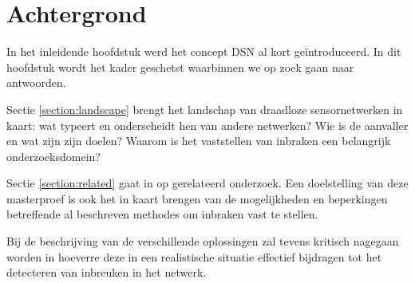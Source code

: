
\chapter{Achtergrond}
\label{chapter:achtergrond}

In het inleidende hoofdstuk werd het concept DSN al kort ge\"introduceerd. In
dit hoofdstuk wordt het kader geschetst waarbinnen we op zoek gaan naar
antwoorden.

Sectie \ref{section:landscape} brengt het landschap van draadloze
sensornetwerken in kaart: wat typeert en onderscheidt hen van andere netwerken?
Wie is de aanvaller en wat zijn zijn doelen? Waarom is het vaststellen van
inbraken een belangrijk onderzoeksdomein?

Sectie \ref{section:related} gaat in op gerelateerd onderzoek. Een doelstelling
van deze masterproef is ook het in kaart brengen van de mogelijkheden en
beperkingen betreffende al beschreven methodes om inbraken vast te stellen.

Bij de beschrijving van de verschillende oplossingen zal tevens kritisch
nagegaan worden in hoeverre deze in een realistische situatie effectief
bijdragen tot het detecteren van inbreuken in het netwerk.



